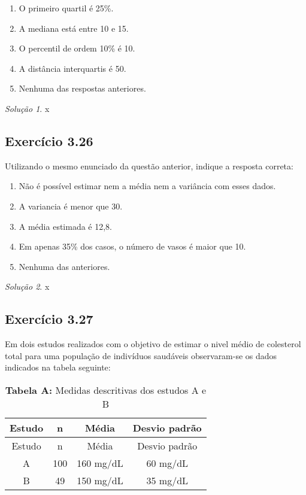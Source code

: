 \documentclass[
]{latex/krantz}
\providecommand{\tightlist}{%
  \setlength{\itemsep}{0pt}\setlength{\parskip}{0pt}}
\theoremstyle{definition}
\theoremstyle{definition}
\theoremstyle{definition}
\theoremstyle{definition}
\theoremstyle{remark}
\newtheorem*{solution}{Solução}
\begin{document}
\begin{enumerate}
\def\labelenumi{\alph{enumi})}
\tightlist
\item
  O primeiro quartil é 25\%.
\item
  A mediana está entre 10 e 15.
\item
  O percentil de ordem 10\% é 10.
\item
  A distância interquartis é 50.
\item
  Nenhuma das respostas anteriores.
\end{enumerate}

\begin{solution}
x
\end{solution}

\hypertarget{exr3-26}{%
\subsection*{Exercício 3.26}\label{exr3-26}}

Utilizando o mesmo enunciado da questão anterior, indique a resposta correta:

\begin{enumerate}
\def\labelenumi{\alph{enumi})}
\tightlist
\item
  Não é possível estimar nem a média nem a variância com esses dados.
\item
  A variancia é menor que 30.
\item
  A média estimada é 12,8.
\item
  Em apenas 35\% dos casos, o número de vasos é maior que 10.
\item
  Nenhuma das anteriores.
\end{enumerate}

\begin{solution}
x
\end{solution}

\hypertarget{exr3-27}{%
\subsection*{Exercício 3.27}\label{exr3-27}}

Em dois estudos realizados com o objetivo de estimar o nivel médio de colesterol total para uma população de indivíduos saudáveis observaram-se os dados indicados na tabela seguinte:

\begin{longtable}[]{@{}cccc@{}}
\caption{\textbf{Tabela A:} Medidas descritivas dos estudos A e B}\tabularnewline
\toprule\noalign{}
Estudo & n & Média & Desvio padrão \\
\midrule\noalign{}
\endfirsthead
\toprule\noalign{}
Estudo & n & Média & Desvio padrão \\
\midrule\noalign{}
\endhead
\bottomrule\noalign{}
\endlastfoot
A & 100 & 160 mg/dL & 60 mg/dL \\
B & 49 & 150 mg/dL & 35 mg/dL \\
\end{longtable}
\end{document}
